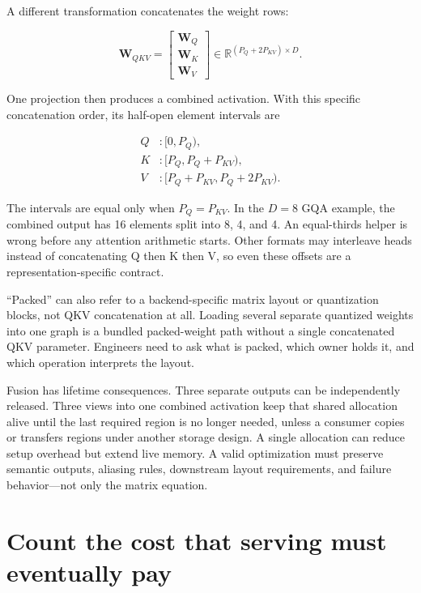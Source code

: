 A different transformation concatenates the weight rows:

\begin{equation}
\mathbf{W}_{QKV}=
\begin{bmatrix}\mathbf{W}_Q\\\mathbf{W}_K\\\mathbf{W}_V\end{bmatrix}
\in\mathbb{R}^{(P_Q+2P_{KV})\times D}.
\end{equation}

One projection then produces a combined activation. With this specific
concatenation order, its half-open element intervals are

\begin{equation}
\begin{aligned}
Q&:[0,P_Q),\\
K&:[P_Q,P_Q+P_{KV}),\\
V&:[P_Q+P_{KV},P_Q+2P_{KV}).
\end{aligned}
\end{equation}

The intervals are equal only when \(P_Q=P_{KV}\). In the \(D=8\) GQA
example, the combined output has 16 elements split into 8, 4, and 4. An
equal-thirds helper is wrong before any attention arithmetic starts.
Other formats may interleave heads instead of concatenating Q then K
then V, so even these offsets are a representation-specific contract.

``Packed'' can also refer to a backend-specific matrix layout or
quantization blocks, not QKV concatenation at all. Loading several
separate quantized weights into one graph is a bundled packed-weight
path without a single concatenated QKV parameter. Engineers need to ask
what is packed, which owner holds it, and which operation interprets the
layout.

Fusion has lifetime consequences. Three separate outputs can be
independently released. Three views into one combined activation keep
that shared allocation alive until the last required region is no longer
needed, unless a consumer copies or transfers regions under another
storage design. A single allocation can reduce setup overhead but extend
live memory. A valid optimization must preserve semantic outputs,
aliasing rules, downstream layout requirements, and failure
behavior---not only the matrix equation.

\section{Count the cost that serving must eventually
pay}\label{count-the-cost-that-serving-must-eventually-pay}

